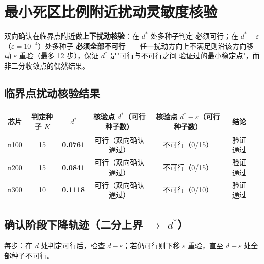 \documentclass[12pt,a4paper]{article}
\begin{document}
\section{最小死区比例附近扰动灵敏度核验}

双向确认在临界点附近做\textbf{上下扰动核验}：在 $d^*$ 处多种子判定
必须可行；在 $d^* - \varepsilon$（$\varepsilon = 10^{-4}$）处多种子
\textbf{必须全部不可行}——任一扰动方向上不满足则沿该方向移动
$\varepsilon$ 重验（最多 12 步），保证 $d^*$ 是"可行与不可行之间
验证过的最小稳定点"，而非二分收敛点的偶然结果。

\subsection{临界点扰动核验结果}

\begin{table}[H]
\centering
\scriptsize
\setlength{\tabcolsep}{2.5pt}
\begin{tabular}{lcccccc}
\toprule
芯片 & 判定种子 $K$ & $d^*$ & 核验点 $d^*$（可行种子数） & 核验点 $d^*-\varepsilon$（可行种子数） & 结论 \\
\midrule

n100 & 15 & \textbf{0.0761} & 可行（双向确认通过） & 不可行（0/15） & 验证通过 \\
n200 & 15 & \textbf{0.0841} & 可行（双向确认通过） & 不可行（0/15） & 验证通过 \\
n300 & 10 & \textbf{0.1118} & 可行（双向确认通过） & 不可行（0/10） & 验证通过 \\
\bottomrule
\end{tabular}
\end{table}

\subsection{确认阶段下降轨迹（二分上界 $\to$ $d^*$）}

每步：在 $d$ 处判定可行后，检查 $d - \varepsilon$；若仍可行则下移
$\varepsilon$ 重验，直至 $d - \varepsilon$ 处全部种子不可行。
\end{document}
